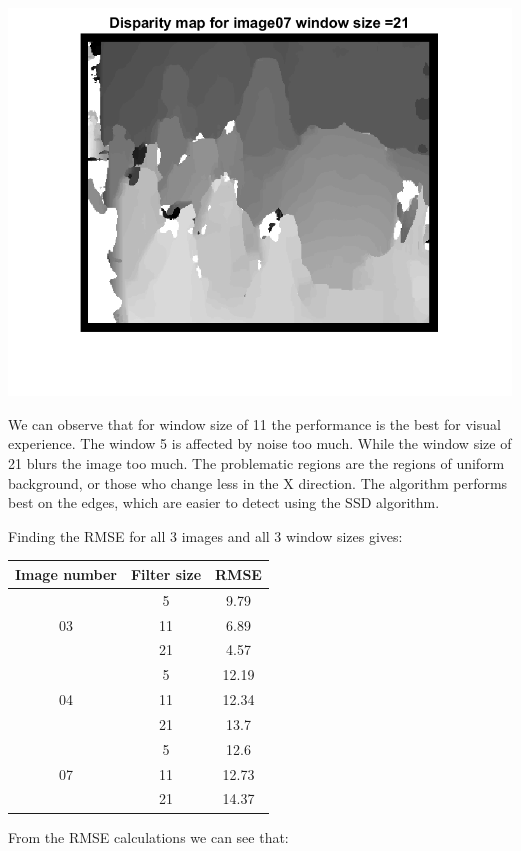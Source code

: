 \documentclass[a4paper]{iacas}
\begin{document}
\begin{minipage}{\linewidth}
	\includegraphics[scale=1]{results/04_16_06/disp_map_07_template_3.png}
	\label{fig_4}
\end{minipage}
\vskip 0.1in


We can observe that for window size of 11 the performance is the best for visual experience. The window 5 is affected by noise too much. While the window size of 21 blurs the image too much. The problematic regions are the regions of uniform background, or those who change less in the X direction. The algorithm performs best on the edges, which are easier to detect using the SSD algorithm.

Finding the RMSE for all 3 images and all 3 window sizes gives:


\begin{table}[]
\begin{tabular}{|c|c|c|}
\hline
Image number        & Filter size & RMSE  \\ \hline
\multirow{3}{*}{03} & 5           & 9.79  \\ \cline{2-3} 
                    & 11          & 6.89  \\ \cline{2-3} 
                    & 21          & 4.57  \\ \hline
\multirow{3}{*}{04} & 5           & 12.19 \\ \cline{2-3} 
                    & 11          & 12.34 \\ \cline{2-3} 
                    & 21          & 13.7  \\ \hline
\multirow{3}{*}{07} & 5           & 12.6  \\ \cline{2-3} 
                    & 11          & 12.73 \\ \cline{2-3} 
                    & 21          & 14.37 \\ \hline
\end{tabular}
\end{table}
From the RMSE calculations we can see that:
\end{document}
